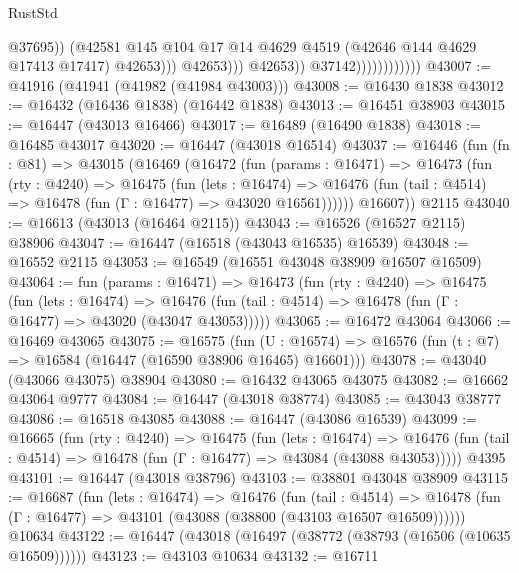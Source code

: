 \begin{lexlean}{RustStd}
\begin{coremodule}
{\begin{coremodule}
{{{{{{{{{{{{{{{{{{{{{{{{{{{{{{{{{{{{{{{{{{{{{{{{{{{{{{{                                              @37695))
                                          (@42581
                                            @145
                                            @104
                                            @17
                                            @14
                                            @4629
                                            @4519
                                            (@42646 @144 @4629 @17413 @17417)
                                            @42653)))
                                      @42653)))
                                @42653))
                            @37142))))))))))))
@43007 := @41916 (@41941 (@41982 (@41984 @43003)))
@43008 := @16430 @1838
@43012 := @16432 (@16436 @1838) (@16442 @1838)
@43013 := @16451 @38903
@43015 := @16447 (@43013 @16466)
@43017 := @16489 (@16490 @1838)
@43018 := @16485 @43017
@43020 := @16447 (@43018 @16514)
@43037 := @16446
    (fun (fn : @81) =>
    @43015
      (@16469
        (@16472
          (fun (params : @16471) =>
          @16473
            (fun (rty : @4240) =>
            @16475
              (fun (lets : @16474) =>
              @16476 (fun (tail : @4514) => @16478 (fun (Γ : @16477) => @43020 @16561))))))
        @16607))
    @2115
@43040 := @16613 (@43013 (@16464 @2115))
@43043 := @16526 (@16527 @2115) @38906
@43047 := @16447 (@16518 (@43043 @16535) @16539)
@43048 := @16552 @2115
@43053 := @16549 (@16551 @43048 @38909 @16507 @16509)
@43064 := fun (params : @16471) =>
  @16473
    (fun (rty : @4240) =>
    @16475
      (fun (lets : @16474) =>
      @16476 (fun (tail : @4514) => @16478 (fun (Γ : @16477) => @43020 (@43047 @43053)))))
@43065 := @16472 @43064
@43066 := @16469 @43065
@43075 := @16575
    (fun (U : @16574) => @16576 (fun (t : @7) => @16584 (@16447 (@16590 @38906 @16465) @16601)))
@43078 := @43040 (@43066 @43075) @38904
@43080 := @16432 @43065 @43075
@43082 := @16662 @43064 @9777
@43084 := @16447 (@43018 @38774)
@43085 := @43043 @38777
@43086 := @16518 @43085
@43088 := @16447 (@43086 @16539)
@43099 := @16665
    (fun (rty : @4240) =>
    @16475
      (fun (lets : @16474) =>
      @16476 (fun (tail : @4514) => @16478 (fun (Γ : @16477) => @43084 (@43088 @43053)))))
    @4395
@43101 := @16447 (@43018 @38796)
@43103 := @38801 @43048 @38909
@43115 := @16687
    (fun (lets : @16474) =>
    @16476
      (fun (tail : @4514) =>
      @16478 (fun (Γ : @16477) => @43101 (@43088 (@38800 (@43103 @16507 @16509))))))
    @10634
@43122 := @16447 (@43018 (@16497 (@38772 (@38793 (@16506 (@10635 @16509))))))
@43123 := @43103 @10634
@43132 := @16711
}}}}}}}}}}}}}}}}}}}}}}}}}}}}}}}}}}}}}}}}}}}}}}}}}}}}}}}
\end{coremodule}}
\end{coremodule}
\end{lexlean}
